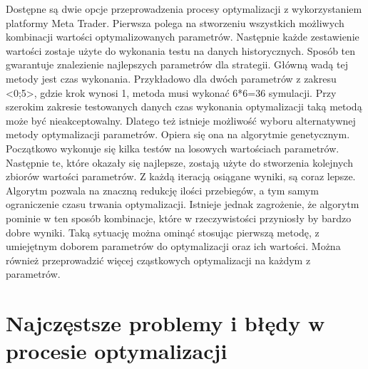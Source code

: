 \documentclass[pdflatex,11pt]{aghdpl}
\begin{document}
Dostępne są dwie opcje przeprowadzenia procesy optymalizacji z wykorzystaniem platformy Meta Trader. Pierwsza polega na stworzeniu wszystkich możliwych kombinacji wartości optymalizowanych parametrów. Następnie każde zestawienie wartości zostaje użyte do wykonania testu na danych historycznych. Sposób ten gwarantuje znalezienie najlepszych parametrów dla strategii. Główną wadą tej metody jest czas wykonania. Przykładowo dla dwóch parametrów z zakresu <0;5>, gdzie krok wynosi 1, metoda musi wykonać 6*6=36 symulacji. Przy szerokim zakresie testowanych danych czas wykonania optymalizacji taką metodą może być nieakceptowalny. Dlatego też istnieje możliwość wyboru alternatywnej metody optymalizacji parametrów. Opiera się ona na algorytmie genetycznym. Początkowo wykonuje się kilka testów na losowych wartościach parametrów. Następnie te, które okazały się najlepsze, zostają użyte do stworzenia kolejnych zbiorów wartości parametrów. Z każdą iteracją osiągane wyniki, są coraz lepsze. Algorytm pozwala na znaczną redukcję ilości przebiegów, a tym samym ograniczenie czasu trwania optymalizacji. Istnieje jednak zagrożenie, że algorytm pominie w ten sposób kombinacje, które w rzeczywistości przyniosły by bardzo dobre wyniki. Taką sytuację można ominąć stosując pierwszą metodę, z umiejętnym doborem parametrów do optymalizacji oraz ich wartości. Można również przeprowadzić więcej cząstkowych optymalizacji na każdym z parametrów. 

\section{Najczęstsze problemy i błędy w procesie optymalizacji}
\paragraph{}
\end{document}
